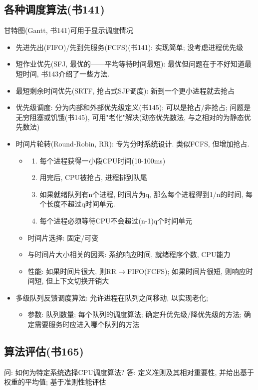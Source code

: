 \documentclass[a4paper, UTF8]{article}
\begin{document}
\subsection{各种调度算法(书141)}
甘特图(Gantt, 书141)可用于显示调度情况
\begin{itemize}
\item 先进先出(FIFO)/先到先服务(FCFS)(书141): 实现简单; 没考虑进程优先级
\item 短作业优先(SFJ, 最优的——平均等待时间最短): 最优但问题在于不好知道最短时间, 书143介绍了一些方法.
\item 最短剩余时间优先(SRTF, 抢占式SJF调度): 新到一个更小进程就去抢占
\item 优先级调度: 分为内部和外部优先级定义(书145); 可以是抢占/非抢占; 问题是无穷阻塞或饥饿(书145), 可用"老化"解决(动态优先数法, 与之相对的为静态优先数法)
\item 时间片轮转(Round-Robin, RR): 专为分时系统设计. 类似FCFS, 但增加抢占.
	\begin{itemize}
	\item \begin{enumerate}
		\item 每个进程获得一小段CPU时间(10-100ms)
		\item 用完后, CPU被抢占, 进程排到队尾
		\item 如果就绪队列有n个进程, 时间片为q, 那么每个进程得到1/n的时间, 每个长度不超过q时间单元.
		\item 每个进程必须等待CPU不会超过(n-1)q个时间单元
		\end{enumerate}
	\item 时间片选择: 固定/可变
	\item 与时间片大小相关的因素: 系统响应时间, 就绪程序个数, CPU能力
	\item 性能: 如果时间片很大, 则RR$\rightarrow$FIFO(FCFS); 如果时间片很短, 则响应时间短, 但上下文切换开销大
	\end{itemize}
\item 多级队列反馈调度算法: 允许进程在队列之间移动, 以实现老化; 
	\begin{itemize}
	\item 参数: 队列数量; 每个队列的调度算法; 确定升优先级/降优先级的方法; 确定需要服务时应进入哪个队列的方法
	\end{itemize}
\end{itemize}

\subsection{算法评估(书165)}
问: 如何为特定系统选择CPU调度算法?
答: 定义准则及其相对重要性, 并给出基于权重的平均值; 基于准则性能评估
\end{document}
